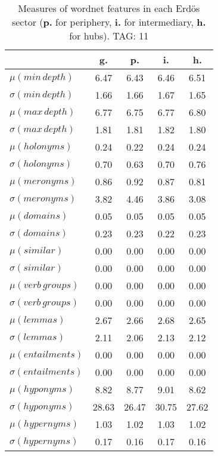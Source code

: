 \begin{table}[h!]
\begin{center}
\begin{tabular}{| l || c | c | c | c |}\hline
 & {\bf g.} & {\bf p.} & {\bf i.} & {\bf h.} \\\hline\hline
$\mu(min\,depth)$ & 6.47  & 6.43  & 6.46  & 6.51 \\
$\sigma(min\,depth)$ & 1.66  & 1.66  & 1.67  & 1.65 \\\hline
$\mu(max\,depth)$ & 6.77  & 6.75  & 6.77  & 6.80 \\
$\sigma(max\,depth)$ & 1.81  & 1.81  & 1.82  & 1.80 \\\hline
$\mu(holonyms)$ & 0.24  & 0.22  & 0.24  & 0.24 \\
$\sigma(holonyms)$ & 0.70  & 0.63  & 0.70  & 0.76 \\\hline
$\mu(meronyms)$ & 0.86  & 0.92  & 0.87  & 0.81 \\
$\sigma(meronyms)$ & 3.82  & 4.46  & 3.86  & 3.08 \\\hline
$\mu(domains)$ & 0.05  & 0.05  & 0.05  & 0.05 \\
$\sigma(domains)$ & 0.23  & 0.23  & 0.22  & 0.23 \\\hline
$\mu(similar)$ & 0.00  & 0.00  & 0.00  & 0.00 \\
$\sigma(similar)$ & 0.00  & 0.00  & 0.00  & 0.00 \\\hline
$\mu(verb\,groups)$ & 0.00  & 0.00  & 0.00  & 0.00 \\
$\sigma(verb\,groups)$ & 0.00  & 0.00  & 0.00  & 0.00 \\\hline
$\mu(lemmas)$ & 2.67  & 2.66  & 2.68  & 2.65 \\
$\sigma(lemmas)$ & 2.11  & 2.06  & 2.13  & 2.12 \\\hline
$\mu(entailments)$ & 0.00  & 0.00  & 0.00  & 0.00 \\
$\sigma(entailments)$ & 0.00  & 0.00  & 0.00  & 0.00 \\\hline
$\mu(hyponyms)$ & 8.82  & 8.77  & 9.01  & 8.62 \\
$\sigma(hyponyms)$ & 28.63  & 26.47  & 30.75  & 27.62 \\\hline
$\mu(hypernyms)$ & 1.03  & 1.02  & 1.03  & 1.02 \\
$\sigma(hypernyms)$ & 0.17  & 0.16  & 0.17  & 0.16 \\\hline
\end{tabular}
\caption{Measures of wordnet features in each Erd\"os sector ({{\bf p.}} for periphery, {{\bf i.}} for intermediary, {{\bf h.}} for hubs). TAG: 11}
\end{center}
\end{table}